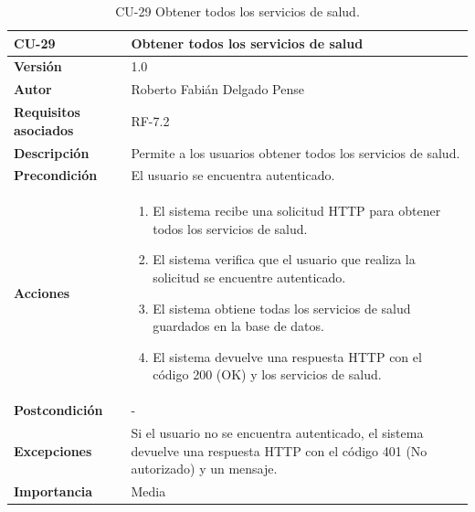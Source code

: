 \begin{table}[p]
	\centering
	\begin{tabularx}{\linewidth}{ p{} p{} }
		\toprule
		\textbf{CU-29}    & \textbf{Obtener todos los servicios de salud}\\
		\toprule
		\textbf{Versión}              & 1.0    \\
		\textbf{Autor}                & Roberto Fabián Delgado Pense \\
		\textbf{Requisitos asociados} & RF-7.2 \\ 
		\textbf{Descripción}          & Permite a los usuarios obtener todos los servicios de salud. \\
		\textbf{Precondición}         & El usuario se encuentra autenticado. \\  
		\textbf{Acciones}             &
		\begin{enumerate}
			\def\labelenumi{\arabic{enumi}.}
			\tightlist
			\item El sistema recibe una solicitud HTTP para obtener todos los servicios de salud.
                \item El sistema verifica que el usuario que realiza la solicitud se encuentre autenticado.
			\item El sistema obtiene todas los servicios de salud guardados en la base de datos.
                \item El sistema devuelve una respuesta HTTP con el código 200 (OK) y los servicios de salud.         
            \end{enumerate}\\
		\textbf{Postcondición}        & -  \\
		\textbf{Excepciones}          &  Si el usuario no se encuentra autenticado, el 
                    sistema devuelve una respuesta HTTP con el código 401 (No autorizado) y un mensaje.\\
		\textbf{Importancia}          & Media \\
		\bottomrule
	\end{tabularx}
	\caption{CU-29 Obtener todos los servicios de salud.}
\end{table}

